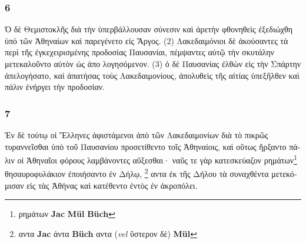 \subsubsection*{6} \textgreek{ Ὁ δὲ Θεμιστοκλῆς διὰ τὴν ὑπερβάλλουσαν σύνεσιν καὶ ἀρετὴν φθονηθεὶς ἐξεδιώχθη ὑπὸ τῶν Ἀθηναίων καὶ παρεγένετο εἰς Ἄργος. (2) Λακεδαιμόνιοι δὲ ἀκούσαντες τὰ περὶ τῆς ἐγκεχειρισμένης προδοσίας Παυσανίαι, πέμψαντες αὐτῷ τὴν σκυτάλην μετεκαλοῦντο αὐτὸν ὡς ἀπο λογησόμενον. (3) ὁ δὲ Παυσανίας ἐλθὼν εἰς τὴν Σπάρτην ἀπελογήσατο, καὶ ἀπατήσας τοὺς Λακεδαιμονίους, ἀπολυθεὶς τῆς αἰτίας ὑπεξῆλθεν καὶ πάλιν ἐνήργει τὴν προδοσίαν.}

\subsubsection*{7} \textgreek{Ἐν δὲ τούτῳ οἱ Ἕλληνες ἀφιστάμενοι ἀπὸ τῶν Λακεδαιμονίων διὰ τὸ πικρῶς τυραννεῖσθαι ὑπὸ τοῦ Παυσανίου προσετίθεντο τοῖς Ἀθηναίοις, καὶ οὕτως ἤρξαντο πάλιν οἱ Ἀθηναῖοι φόρους λαμβάνοντες αὔξεσθαι· ναῦς τε γὰρ κατεσκεύαζον ρημάτων}\footnote{\textgreek{ρημάτων} \textbf{Jac} \textbf{Mül} \textgreek{}  \textbf{Büch}} \textgreek{θησαυροφυλάκιον ἐποιήσαντο ἐν Δήλῳ,} \footnote{\textgreek{αντα} \textbf{Jac} \textgreek{άντα}  \textbf{Büch} \textgreek{αντα } (\textit{vel} \textgreek{ὕστερον δὲ}) \textbf{Mül} } \textgreek{αντα ἐκ τῆς Δήλου τὰ συναχθέντα  μετεκόμισαν εἰς τὰς Ἀθήνας καὶ κατέθεντο ἐντὸς ἐν ἀκροπόλει.} 

